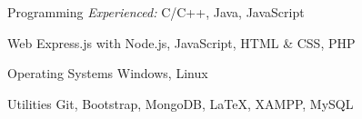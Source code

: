 

\begin{cvskills}

  \cvskill
    {Programming} %
    {\iffalse{\em Proficient:}\hspace{0.5em}\fi {\em Experienced:} C/C++, Java, JavaScript } %

  \cvskill
    {Web} %
    {Express.js with Node.js, JavaScript, HTML \& CSS, PHP } %

  \cvskill
    {Operating Systems} %
    {Windows, Linux} %

  \cvskill
    {Utilities} %
    {Git, Bootstrap, MongoDB, \LaTeX, XAMPP, MySQL} %
    
\end{cvskills}
